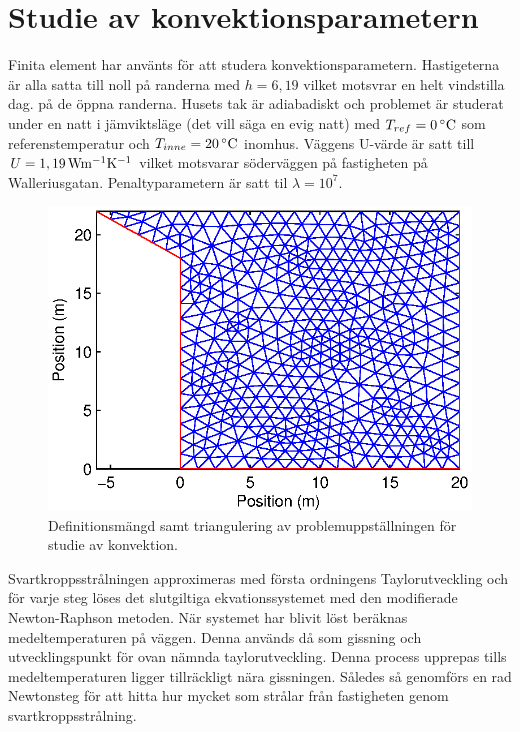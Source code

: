 \section{Studie av konvektionsparametern}

Finita element har använts för att studera konvektionsparametern. Hastigeterna är alla
satta till noll på randerna med $h=6,19$ vilket motsvrar en helt vindstilla dag.
på de öppna randerna. Husets tak är adiabadiskt
och problemet är studerat under en natt i jämviktsläge (det vill säga en evig natt) med
$T_{ref} = \unit[0]{^\circ C}$ som referenstemperatur och $T_{inne} = \unit[20]{^\circ C}$ inomhus.
Väggens U-värde är satt till $U = \unit[1,19]{Wm^{-1}K^{-1}}$ vilket motsvarar söderväggen på fastigheten på Walleriusgatan. Penaltyparametern är satt til $\lambda = 10^7$.

\begin{figure}
\centering
\includegraphics{images/triconvec.eps}
\caption{Definitionsmängd samt triangulering av problemuppställningen för studie av konvektion.}
\end{figure}

Svartkroppsstrålningen approximeras med första ordningens Taylorutveckling och
för varje steg löses det slutgiltiga ekvationssystemet med den
modifierade Newton-Raphson metoden. När systemet har blivit löst beräknas
medeltemperaturen på väggen. Denna används då som gissning och utvecklingspunkt
för ovan nämnda taylorutveckling. Denna process upprepas tills medeltemperaturen
ligger tillräckligt nära gissningen. Således så genomförs en rad Newtonsteg
för att hitta hur mycket som strålar från fastigheten genom svartkroppsstrålning.

